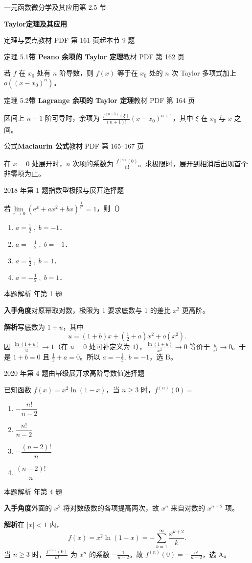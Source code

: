 \documentclass[UTF8,zihao=-4,fontset=fandol]{ctexart}
\renewcommand{\lim}{\operatorname*{lim}\limits}
\newcommand{\SectionHeading}[4]{%
  \clearpage\hypertarget{sec-#1}{}%
  {\small\textcolor{accent}{#2\hfill 第 #1 节}}\par\medskip
  {\LARGE\bfseries #3}\par\smallskip
  {\small\textcolor{muted}{#4}}\par\bigskip}
\newcommand{\Theory}[4]{%
  {\small\textcolor{accent}{#1}\quad\textbf{#3}\hfill\textcolor{muted}{教材 PDF 第 #2 页}}\par
  {\small #4}\par\smallskip}
\newcommand{\pickout}{\hfill（\hspace{1.4em}）}
\newenvironment{abcd}{\begin{enumerate}[label=\textup{(\Alph*)},leftmargin=2.3em,itemsep=1pt,topsep=4pt,parsep=1pt]}{\end{enumerate}}
\newcommand{\choices}[4]{%
  \begin{abcd}
    \item #1
    \item #2
    \item #3
    \item #4
  \end{abcd}}
\newcommand{\QuestionPage}[6]{%
  \par\noindent\begin{minipage}{\linewidth}
  \raggedright
  {\small\textcolor{black!60}{#3\quad #5}\hfill\textcolor{accent}{#2}}\par\smallskip}
\newcommand{\QuestionEnd}{\end{minipage}\par\medskip}
\newcommand{\QuestionPage}[6]{%
  \clearpage
  {\small\textcolor{accent}{#1\hfill #2}}\par\medskip
  {\small\textcolor{black!60}{#3\quad #5\hfill #6}}\par\vspace{9bp}}
\newcommand{\QuestionEnd}{}
\newenvironment{QuestionSolution}[1]{%
  \clearpage
  {\small\textcolor{black!60}{本题解析\quad #1}}\par\medskip
}{\par\clearpage}
\begin{document}
\SectionHeading{2.5}{一元函数微分学及其应用}{Taylor定理及其应用}{定理与要点\quad 教材 PDF 第 161 页起\hfill 本节 9 题}
\Theory{定理 5.1}{162}{带 Peano 余项的 Taylor 定理}{若 \(f\) 在 \(x_0\) 处有 \(n\) 阶导数，则 \(f(x)\) 等于在 \(x_0\) 处的 \(n\) 次 Taylor 多项式加上 \(o((x-x_0)^n)\)。}
\Theory{定理 5.2}{164}{带 Lagrange 余项的 Taylor 定理}{区间上 \(n+1\) 阶可导时，余项为 \(\frac{f^{(n+1)}(\xi)}{(n+1)!}(x-x_0)^{n+1}\)，其中 \(\xi\) 在 \(x_0\) 与 \(x\) 之间。}
\Theory{公式}{165--167}{Maclaurin 公式}{在 \(x=0\) 处展开时，\(n\) 次项的系数为 \(\frac{f^{(n)}(0)}{n!}\)。求极限时，展开到相消后出现首个非零项为止。}
\QuestionPage{2.5 Taylor定理及其应用}{选择题}{2018 年第 1 题}{1}{指数型极限与展开}{096 / 234}
若$\lim_{x \to 0} \left(\mathrm{e}^x + ax^2 + bx \right)^{\frac{1}{x^2}} = 1$，则\pickout{}
\begin{abcd}
\item $a = \frac{1}{2}\;,\;b = - 1$．
\item $a = - \frac{1}{2}\;,\;b = - 1$．
\item $a = \frac{1}{2}\;,\;b = 1$．
\item $a = - \frac{1}{2}\;,\;b = 1$．
\end{abcd}
\QuestionEnd

\begin{QuestionSolution}{2018 年第 1 题}
\textbf{入手角度}\quad 对原幂取对数，极限为 \(1\) 要求底数与 \(1\) 的差比 \(x^2\) 更高阶。

\textbf{解析}\quad 写底数为 \(1+u\)，其中
\[
u=(1+b)x+(\tfrac12+a)x^2+o(x^2).
\]
因 \(\frac{\ln(1+u)}{u}\to1\)（在 \(u=0\) 处可补定义为 \(1\)），\(\frac{\ln(1+u)}{x^2}\to0\) 等价于 \(\frac{u}{x^2}\to0\)。于是 \(1+b=0\) 且 \(\tfrac12+a=0\)。所以 \(\boxed{a=-\frac{1}{2},\ b=-1}\)，选 B。
\end{QuestionSolution}

\QuestionPage{2.5 Taylor定理及其应用}{选择题}{2020 年第 4 题}{1}{由幂级展开求高阶导数值}{097 / 234}
已知函数 \(f\left( x \right) = x^{2} \ln \left( 1-x \right)\)，当 \(n \geq 3\) 时，\(f^{\left( n \right)}\left( 0 \right) =\)
\choices{\(-\dfrac{n!}{n-2}\)}{\(\dfrac{n!}{n-2}\)}{\(-\dfrac{\left( n-2 \right)!}{n}\)}{\(\dfrac{\left( n-2 \right)!}{n}\)}
\QuestionEnd

\begin{QuestionSolution}{2020 年第 4 题}
\textbf{入手角度}\quad 外面的 \(x^2\) 将对数级数的各项提高两次，故 \(x^n\) 来自对数的 \(x^{n-2}\) 项。

\textbf{解析}\quad 在 \(|x|<1\) 内，
\[
f(x)=x^2\ln(1-x)=-\sum_{k=1}^{\infty}\frac{x^{k+2}}{k}.
\]
当 \(n\ge3\) 时，\(\frac{f^{(n)}(0)}{n!}\) 为 \(x^n\) 的系数 \(-\frac{1}{n-2}\)。故 \(\boxed{f^{(n)}(0)=-\frac{n!}{n-2}}\)，选 A。
\end{QuestionSolution}
\end{document}
